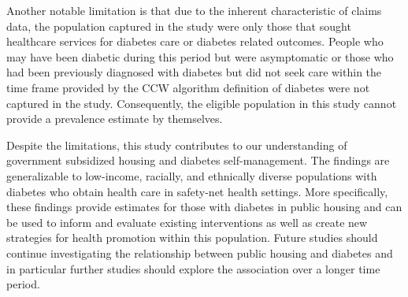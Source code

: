 \documentclass [11pt, proquest] {uwthesis}[2015/03/03]
\begin{document}
Another notable limitation is that due to the inherent characteristic of
claims data, the population captured in the study were only those that
sought healthcare services for diabetes care or diabetes related
outcomes. People who may have been diabetic during this period but were
asymptomatic or those who had been previously diagnosed with diabetes
but did not seek care within the time frame provided by the CCW
algorithm definition of diabetes were not captured in the study.
Consequently, the eligible population in this study cannot provide a
prevalence estimate by themselves.

Despite the limitations, this study contributes to our understanding of
government subsidized housing and diabetes self-management. The findings
are generalizable to low-income, racially, and ethnically diverse
populations with diabetes who obtain health care in safety-net health
settings. More specifically, these findings provide estimates for those
with diabetes in public housing and can be used to inform and evaluate
existing interventions as well as create new strategies for health
promotion within this population. Future studies should continue
investigating the relationship between public housing and diabetes and
in particular further studies should explore the association over a
longer time period.

\appendix
\end{document}
